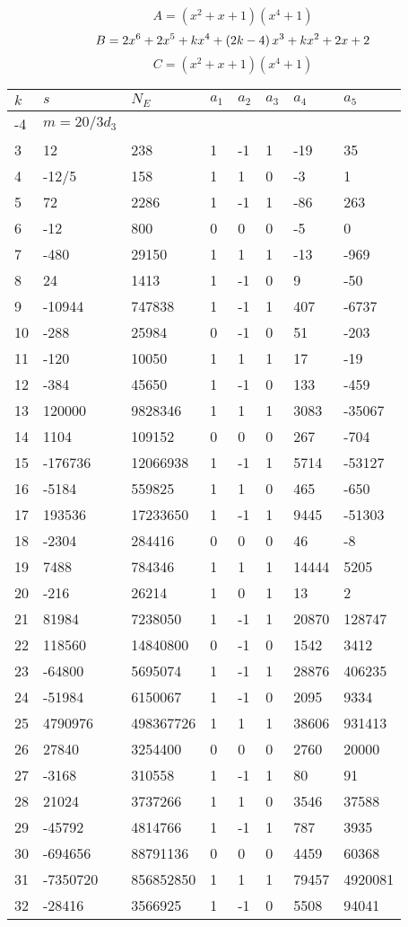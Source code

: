 \documentclass{amsart}
\begin{document}
$$A=(x^2
 + x
 + 1)(x^4
 + 1)$$
$$B=2\*x^6
 + 2\*x^5
 + k\*x^4
 + \left(2\*k
 - 4\right) \*x^3
 + k\*x^2
 + 2\*x
 + 2$$
$$C=(x^2
 + x
 + 1)(x^4
 + 1)$$
\begin{longtable}{|l|l|l|lllll|}
\hline
$k$ & $s$ & $N_E$ & $a_1$ & $a_2$ & $a_3$ & $a_4$ & $a_5$\\
\hline
-4&$m=20/3d_{3}$&&\multicolumn{5}{c|}{}\\
3&12&238&1&-1&1&-19&35\\
4&-12/5&158&1&1&0&-3&1\\
5&72&2286&1&-1&1&-86&263\\
6&-12&800&0&0&0&-5&0\\
7&-480&29150&1&1&1&-13&-969\\
8&24&1413&1&-1&0&9&-50\\
9&-10944&747838&1&-1&1&407&-6737\\
10&-288&25984&0&-1&0&51&-203\\
11&-120&10050&1&1&1&17&-19\\
12&-384&45650&1&-1&0&133&-459\\
13&120000&9828346&1&1&1&3083&-35067\\
14&1104&109152&0&0&0&267&-704\\
15&-176736&12066938&1&-1&1&5714&-53127\\
16&-5184&559825&1&1&0&465&-650\\
17&193536&17233650&1&-1&1&9445&-51303\\
18&-2304&284416&0&0&0&46&-8\\
19&7488&784346&1&1&1&14444&5205\\
20&-216&26214&1&0&1&13&2\\
21&81984&7238050&1&-1&1&20870&128747\\
22&118560&14840800&0&-1&0&1542&3412\\
23&-64800&5695074&1&-1&1&28876&406235\\
24&-51984&6150067&1&-1&0&2095&9334\\
25&4790976&498367726&1&1&1&38606&931413\\
26&27840&3254400&0&0&0&2760&20000\\
27&-3168&310558&1&-1&1&80&91\\
28&21024&3737266&1&1&0&3546&37588\\
29&-45792&4814766&1&-1&1&787&3935\\
30&-694656&88791136&0&0&0&4459&60368\\
31&-7350720&856852850&1&1&1&79457&4920081\\
32&-28416&3566925&1&-1&0&5508&94041\\

\end{longtable}
\end{document}
